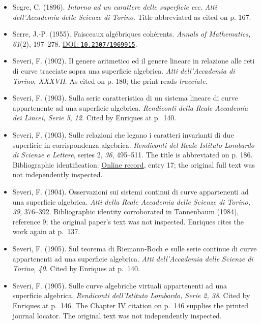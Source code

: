 \begin{sloppypar}
\begin{itemize}
\item Segre, C. (1896). \emph{Intorno ad un carattere delle superficie ecc.} \emph{Atti dell'Accademia delle Scienze di Torino}. Title abbreviated as cited on p. 167.

\item Serre, J.-P. (1955). Faisceaux algébriques cohérents. \emph{Annals of Mathematics, 61}(2), 197--278. \href{https://doi.org/10.2307/1969915}{DOI: \nolinkurl{10.2307/1969915}}.

\item Severi, F. (1902). Il genere aritmetico ed il genere lineare in relazione alle reti di curve tracciate sopra una superficie algebrica. \emph{Atti dell'Accademia di Torino, XXXVII}. As cited on p. 180; the print reads \emph{tracciate}.

\item Severi, F. (1903). Sulla serie caratteristica di un sistema lineare di curve appartenente ad una superficie algebrica. \emph{Rendiconti della Reale Accademia dei Lincei, Serie 5, 12}. Cited by Enriques at p.~140.

\item Severi, F. (1903). Sulle relazioni che legano i caratteri invarianti di due superficie in corrispondenza algebrica. \emph{Rendiconti del Reale Istituto Lombardo di Scienze e Lettere}, series 2, \emph{36}, 495--511. The title is abbreviated on p. 186. Bibliographic identification: \href{https://www.mat.uniroma3.it/users/sernesi/BIBLIOGRAFIA/severi.htm}{Online record}, entry 17; the original full text was not independently inspected.

\item Severi, F. (1904). Osservazioni sui sistemi continui di curve appartenenti ad una superficie algebrica. \emph{Atti della Reale Accademia delle Scienze di Torino, 39}, 376--392. Bibliographic identity corroborated in Tannenbaum (1984), reference 9; the original paper's text was not inspected. Enriques cites the work again at p.~137.

\item Severi, F. (1905). Sul teorema di Riemann-Roch e sulle serie continue di curve appartenenti ad una superficie algebrica. \emph{Atti dell'Accademia delle Scienze di Torino, 40}. Cited by Enriques at p.~140.

\item Severi, F. (1905). Sulle curve algebriche virtuali appartenenti ad una superficie algebrica. \emph{Rendiconti dell'Istituto Lombardo, Serie 2, 38}. Cited by Enriques at p.~146. The Chapter IV citation on p.~146 supplies the printed journal locator. The original text was not independently inspected.


\end{itemize}
\end{sloppypar}
